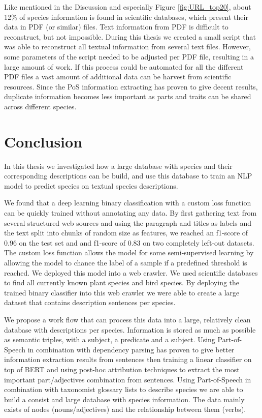 \documentclass[a4paper, 12pt, oneside]{book} %
\begin{document}
Like mentioned in the Discussion and especially Figure \ref{fig:URL_top20}, about 12\% of species information is found in scientific databases, which present their data in PDF (or similar) files.
Text information from PDF is difficult to reconstruct, but not impossible.
During this thesis we created a small script that was able to reconstruct all textual information from several text files.
However, some parameters of the script needed to be adjusted per PDF file, resulting in a large amount of work.
If this process could be automated for all the different PDF files a vast amount of additional data can be harvest from scientific resources.
Since the PoS information extracting has proven to give decent results, duplicate information becomes less important as parts and traits can be shared across different species.

\newpage
\section{Conclusion} \label{par:conclusion}
In this thesis we investigated how a large database with species and their corresponding descriptions can be build, and use this database to train an NLP model to predict species on textual species descriptions.

We found that a deep learning binary classification with a custom loss function can be quickly trained without annotating any data.
By first gathering text from several structured web sources and using the paragraph and titles as labels and the text split into chunks of random size as features, we reached an f1-score of 0.96 on the test set and and f1-score of 0.83 on two completely left-out datasets.
The custom loss function allows the model for some semi-supervised learning by allowing the model to chance the label of a sample if a predefined threshold is reached.
We deployed this model into a web crawler.
We used scientific databases to find all currently known plant species and bird species.
By deploying the trained binary classifier into this web crawler we were able to create a large dataset that contains description sentences per species.

We propose a work flow that can process this data into a large, relatively clean database with descriptions per species.
Information is stored as much as possible as semantic triples, with a subject, a predicate and a subject.
Using Part-of-Speech in combination with dependency parsing has proven to give better information extraction results from sentences then training a linear classifier on top of BERT and using post-hoc attribution techniques to extract the most important part/adjectives combination from sentences.
Using Part-of-Speech in combination with taxonomist glossary lists to describe species we are able to build a consist and large database with species information.
The data mainly exists of nodes (nouns/adjectives) and the relationship between them (verbs).
\end{document}
